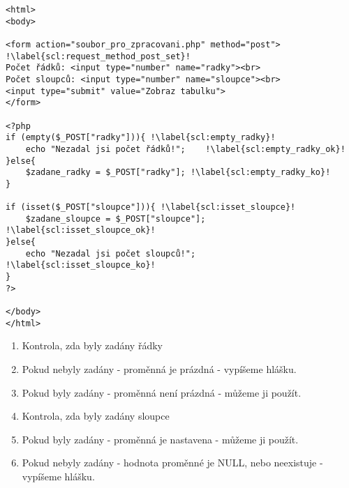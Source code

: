 \begin{minipage}[t]{.45\textwidth}
\begin{code}
\begin{verbatim}
<html>
<body>

<form action="soubor_pro_zpracovani.php" method="post"> !\label{scl:request_method_post_set}!
Počet řádků: <input type="number" name="radky"><br>
Počet sloupců: <input type="number" name="sloupce"><br>
<input type="submit" value="Zobraz tabulku">
</form>

<?php
if (empty($_POST["radky"])){ !\label{scl:empty_radky}!
	echo "Nezadal jsi počet řádků!";	!\label{scl:empty_radky_ok}!
}else{
	$zadane_radky = $_POST["radky"]; !\label{scl:empty_radky_ko}!
}

if (isset($_POST["sloupce"])){ !\label{scl:isset_sloupce}!
	$zadane_sloupce = $_POST["sloupce"]; !\label{scl:isset_sloupce_ok}!
}else{
	echo "Nezadal jsi počet sloupců!";	 !\label{scl:isset_sloupce_ko}!
}
?> 

</body>
</html> 
\end{verbatim}

\label{code:php_empty}
\end{code}
\end{minipage}
\begin{minipage}[t]{.45\textwidth}
\vspace{9cm}
\begin{enumerate}
\item[ř. \ref{scl:empty_radky}:] Kontrola, zda byly zadány řádky
\item[ř. \ref{scl:empty_radky_ok}:] Pokud nebyly zadány - proměnná je prázdná - vypíšeme hlášku.
\item[ř. \ref{scl:empty_radky_ko}:] Pokud byly zadány - proměnná není prázdná - můžeme ji použít.
\item[ř. \ref{scl:isset_sloupce}:] Kontrola, zda byly zadány sloupce
\item[ř. \ref{scl:isset_sloupce_ok}:] Pokud byly zadány - proměnná je nastavena - můžeme ji použít.
\item[ř. \ref{scl:isset_sloupce_ko}:] Pokud nebyly zadány - hodnota proměnné je NULL, nebo neexistuje - vypíšeme hlášku.
\end{enumerate}
\end{minipage}




